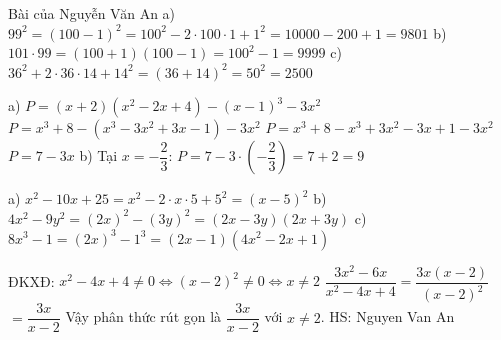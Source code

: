 \begin{problem}[8DS-HDT-003]
Bài của Nguyễn Văn An
a) $99^2 = (100 - 1)^2 = 100^2 - 2 \cdot 100 \cdot 1 + 1^2 = 10000 - 200 + 1 = 9801$
b) $101 \cdot 99 = (100 + 1)(100 - 1) = 100^2 - 1 = 9999$
c) $36^2 + 2 \cdot 36 \cdot 14 + 14^2 = (36 + 14)^2 = 50^2 = 2500$
\end{problem}

\begin{problem}[8DS-HDT-004]
a) $P = (x + 2)(x^2 - 2x + 4) - (x - 1)^3 - 3x^2$
$P = x^3 + 8 - (x^3 - 3x^2 + 3x - 1) - 3x^2$
$P = x^3 + 8 - x^3 + 3x^2 - 3x + 1 - 3x^2$
$P = 7 - 3x$
b) Tại $x = -\dfrac{2}{3}$: $P = 7 - 3 \cdot \left(-\dfrac{2}{3}\right) = 7 + 2 = 9$
\end{problem}

\begin{problem}[8DS-PTNT-002]
a) $x^2 - 10x + 25 = x^2 - 2 \cdot x \cdot 5 + 5^2 = (x - 5)^2$
b) $4x^2 - 9y^2 = (2x)^2 - (3y)^2 = (2x - 3y)(2x + 3y)$
c) $8x^3 - 1 = (2x)^3 - 1^3 = (2x - 1)(4x^2 - 2x + 1)$
\end{problem}

\begin{problem}[8DS-PS-002]
ĐKXĐ: $x^2 - 4x + 4 \neq 0 \Leftrightarrow (x - 2)^2 \neq 0 \Leftrightarrow x \neq 2$
$\dfrac{3x^2 - 6x}{x^2 - 4x + 4} = \dfrac{3x(x - 2)}{(x - 2)^2}$
$= \dfrac{3x}{x - 2}$
Vậy phân thức rút gọn là $\dfrac{3x}{x - 2}$ với $x \neq 2$.
HS: Nguyen Van An
\end{problem}
